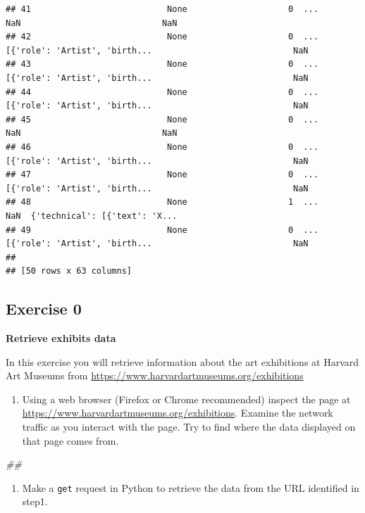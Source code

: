\documentclass[
]{book}
\newenvironment{Shaded}{\begin{snugshade}}{\end{snugshade}}
\newcommand{\CommentTok}[1]{\textcolor[rgb]{0.56,0.35,0.01}{\textit{#1}}}
\providecommand{\tightlist}{%
  \setlength{\itemsep}{0pt}\setlength{\parskip}{0pt}}
\begin{document}
\begin{verbatim}
## 41                           None                    0  ...                            NaN                            NaN
## 42                           None                    0  ...  [{'role': 'Artist', 'birth...                            NaN
## 43                           None                    0  ...  [{'role': 'Artist', 'birth...                            NaN
## 44                           None                    0  ...  [{'role': 'Artist', 'birth...                            NaN
## 45                           None                    0  ...                            NaN                            NaN
## 46                           None                    0  ...  [{'role': 'Artist', 'birth...                            NaN
## 47                           None                    0  ...  [{'role': 'Artist', 'birth...                            NaN
## 48                           None                    1  ...                            NaN  {'technical': [{'text': 'X...
## 49                           None                    0  ...  [{'role': 'Artist', 'birth...                            NaN
## 
## [50 rows x 63 columns]
\end{verbatim}

\hypertarget{exercise-0-4}{%
\subsection{Exercise 0}\label{exercise-0-4}}

\textbf{Retrieve exhibits data}

In this exercise you will retrieve information about the art exhibitions at Harvard Art Museums from \url{https://www.harvardartmuseums.org/exhibitions}

\begin{enumerate}
\def\labelenumi{\arabic{enumi}.}
\tightlist
\item
  Using a web browser (Firefox or Chrome recommended) inspect the
  page at \url{https://www.harvardartmuseums.org/exhibitions}. Examine
  the network traffic as you interact with the page. Try to find
  where the data displayed on that page comes from.
\end{enumerate}

\begin{Shaded}
\begin{Highlighting}[]
\CommentTok{\#\#}
\end{Highlighting}
\end{Shaded}

\begin{enumerate}
\def\labelenumi{\arabic{enumi}.}
\setcounter{enumi}{1}
\tightlist
\item
  Make a \texttt{get} request in Python to retrieve the data from the URL
  identified in step1.
\end{enumerate}
\end{document}
